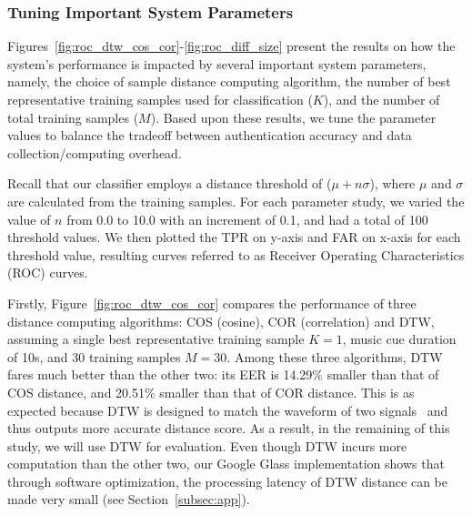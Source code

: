 \subsubsection{Tuning Important System Parameters}
Figures~\ref{fig:roc_dtw_cos_cor}-\ref{fig:roc_diff_size} present the results on how the system's performance is impacted by several important system parameters, namely, the choice of sample distance computing algorithm, the number of best representative training samples used for classification ($K$), and the number of total training samples ($M$).
Based upon these results, we tune the parameter values to balance the tradeoff between authentication accuracy and data collection/computing overhead.

Recall that our classifier employs a distance threshold of ($\mu+n\sigma$), where $\mu$ and $\sigma$ are calculated from the training samples. For each parameter study, we varied the value of $n$ from 0.0 to 10.0 with an increment of 0.1, and had a total of 100 threshold values. We then plotted the TPR  on y-axis and FAR on x-axis for each threshold value,  resulting curves referred to as Receiver Operating Characteristics (ROC) curves. %

Firstly, Figure~\ref{fig:roc_dtw_cos_cor} compares the performance of three distance computing algorithms: COS (cosine), COR (correlation) and DTW, assuming a single best representative training sample $K=1$, music cue duration of 10s, and 30 training samples $M=30$.  Among these three algorithms, DTW fares much better than the other two: its EER is 14.29\% smaller than that of COS distance, and 20.51\% smaller than that of COR distance. This is as expected because DTW is designed to match the waveform of two signals~\cite{dtw} and thus outputs more accurate distance score. As a result, in the remaining of this study, we will use DTW for evaluation. Even though DTW incurs more computation than the other two, our Google Glass implementation shows that through software optimization, the processing latency of DTW distance can be made very small (see Section~\ref{subsec:app}).


